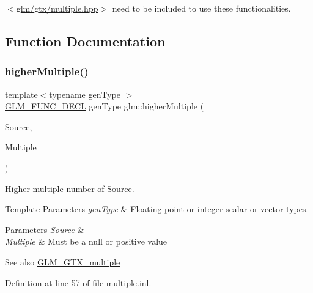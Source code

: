 $<$\hyperlink{multiple_8hpp}{glm/gtx/multiple.\+hpp}$>$ need to be included to use these functionalities. 

\subsection{Function Documentation}
\mbox{\label{group__gtx__multiple_gaa2bb85aaacfdb9366b8365f8d5c7e25d}} 
\subsubsection{\texorpdfstring{higher\+Multiple()}{higherMultiple()}}
{\footnotesize\ttfamily template$<$typename gen\+Type $>$ \\
\hyperlink{setup_8hpp_ab2d052de21a70539923e9bcbf6e83a51}{G\+L\+M\+\_\+\+F\+U\+N\+C\+\_\+\+D\+E\+CL} gen\+Type glm\+::higher\+Multiple (\begin{DoxyParamCaption}\item[{gen\+Type const \&}]{Source,  }\item[{gen\+Type const \&}]{Multiple }\end{DoxyParamCaption})}

Higher multiple number of Source.


\begin{DoxyTemplParams}{Template Parameters}
{\em gen\+Type} & Floating-\/point or integer scalar or vector types. \\
\hline
\end{DoxyTemplParams}

\begin{DoxyParams}{Parameters}
{\em Source} & \\
\hline
{\em Multiple} & Must be a null or positive value\\
\hline
\end{DoxyParams}
\begin{DoxySeeAlso}{See also}
\hyperlink{group__gtx__multiple}{G\+L\+M\+\_\+\+G\+T\+X\+\_\+multiple} 
\end{DoxySeeAlso}


Definition at line 57 of file multiple.\+inl.

\mbox{\label{group__gtx__multiple_ga11b955f3cb3589d561c8991118771ea6}} 
